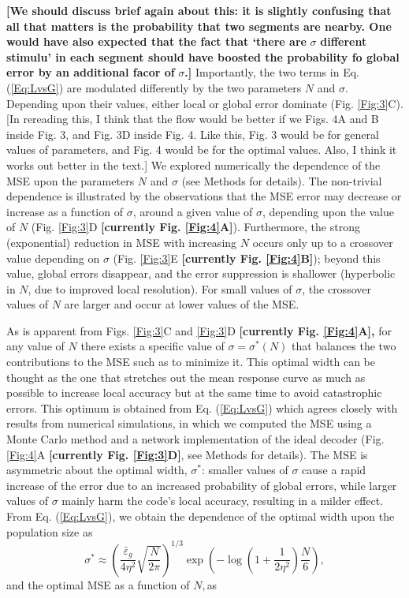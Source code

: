 \documentclass[a4paper]{article}%
\begin{document}
\textbf{[We should discuss brief again about this: it is slightly confusing
that all that matters is the probability that two segments are nearby. One
would have also expected that the fact that `there are }$\sigma$\textbf{
different stimulu' in each segment should have boosted the probability fo
global error by an additional facor of }$\sigma$\textbf{.]} Importantly, the
two terms in Eq. (\ref{Eq:LvsG}) are modulated differently by the two
parameters $N$ and $\sigma$. Depending upon their values, either local or
global error dominate (Fig. \ref{Fig:3}C). [In rereading this, I think that
the flow would be better if we Figs. 4A and B inside Fig. 3, and Fig. 3D
inside Fig. 4. Like this, Fig. 3 would be for general values of parameters,
and Fig. 4 would be for the optimal values. Also, I think it works out better
in the text.] We explored numerically the dependence of the MSE upon the
parameters $N$ and $\sigma$ (see Methods for details). The non-trivial
dependence is illustrated by the observations that the MSE error may decrease
or increase as a function of $\sigma$, around a given value of $\sigma$,
depending upon the value of $N$ (Fig. \ref{Fig:3}D \textbf{[currently Fig.
\ref{Fig:4}A]}). Furthermore, the strong (exponential) reduction in MSE with
increasing $N$ occurs only up to a crossover value depending on $\sigma$ (Fig.
\ref{Fig:3}E \textbf{[currently Fig. \ref{Fig:4}B]}); beyond this value,
global errors disappear, and the error suppression is shallower (hyperbolic in
$N$, due to improved local resolution). For small values of $\sigma$, the
crossover values of $N$ are larger and occur at lower values of the MSE.

As is apparent from Figs. \ref{Fig:3}C and \ref{Fig:3}D \textbf{[currently
Fig. \ref{Fig:4}A], }for any value of $N$ there exists a specific value of
$\sigma=\sigma^{\ast}\left(  N\right)  $ that balances the two contributions
to the MSE such as to minimize it. This optimal width can be thought as the
one that stretches out the mean response curve as much as possible to increase
local accuracy but at the same time to avoid catastrophic errors. This optimum
is obtained from Eq. (\ref{Eq:LvsG}) which agrees closely with results from
numerical simulations, in which we computed the MSE using a Monte Carlo method
and a network implementation of the ideal decoder (Fig. \ref{Fig:4}A
\textbf{[currently Fig. \ref{Fig:3}D]}, see Methods for details). The MSE is
asymmetric about the optimal width, $\sigma^{\ast}$: smaller values of
$\sigma$ cause a rapid increase of the error due to an increased probability
of global errors, while larger values of $\sigma$ mainly harm the code's local
accuracy, resulting in a milder effect. From Eq. (\ref{Eq:LvsG}), we obtain
the dependence of the optimal width upon the population size as
\begin{equation}
\sigma^{\ast}\approx\left(  \frac{\bar{\varepsilon}_{g}}{4\eta^{2}}\sqrt
{\frac{N}{2\pi}}\right)  ^{1/3}\exp\left(  {-\log\left(  {1+\frac{1}{2\eta
^{2}}}\right)  \frac{N}{6}}\right)  ,\label{Sigma_opt}%
\end{equation}
and the optimal MSE as a function of $N,$as %
\end{document}
